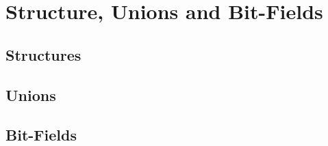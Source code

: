 \section{Structure, Unions and Bit-Fields}

\subsection{Structures}
\subsection{Unions}
\subsection{Bit-Fields}
